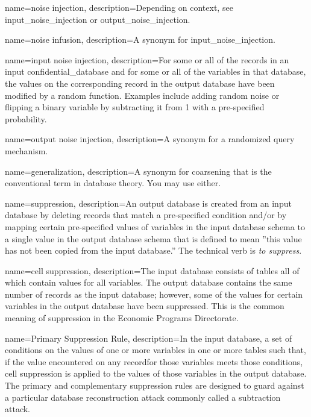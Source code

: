 {
    name=noise injection,
    description={Depending on context, see \gls{input_noise_injection} or \gls{output_noise_injection}.}
}

{
    name=noise infusion,
    description={A synonym for \gls{input_noise_injection}. }
}

{
    name=input noise injection,
    description={For some or all of the \glspl{record} in an input \gls{confidential_database} and for some or all of the variables in that database, the values on the corresponding record in the output database have been modified by a random function. Examples include adding random noise or flipping a binary variable by subtracting it from 1 with a pre-specified probability.}
}

{
    name=output noise injection,
    description={A synonym for a randomized query mechanism.}
}

{
    name=generalization,
    description={A synonym for \gls{coarsening} that is the conventional term in database theory. You may use either.}
}

{
    name=suppression,
    description={An output database is created from an input database by deleting \glspl{record} that match a pre-specified condition and/or by mapping certain pre-specified values of variables in the input database schema to a single value in the output database schema that is defined to mean ''this value has not been copied from the input database.'' The technical verb is \textit{to suppress}.}
}

{
    name=cell suppression,
    description={The input database consists of tables all of which contain values for all variables. The output database contains the same number of \glspl{record} as the input database; however, some of the values for certain variables in the output database have been suppressed. This is the common meaning of \gls{suppression} in the Economic Programs Directorate.}
}

{
    name=Primary Suppression Rule,
    description={In the input database, a set of conditions on the values of one or more variables in one or more tables such that, if the value encountered on any \gls{record}for those variables meets those conditions, cell suppression is applied to the values of those variables in the output database. The primary and complementary suppression rules are designed to guard against a particular database reconstruction attack commonly called a subtraction attack.}
}

